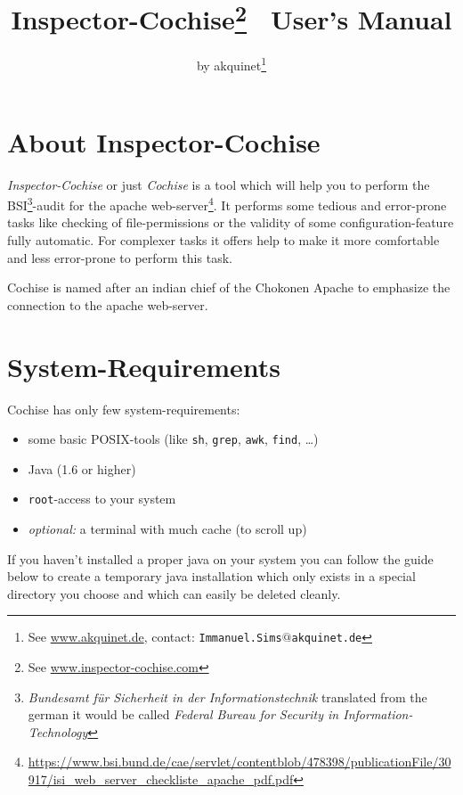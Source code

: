 \documentclass{article}
\title{Inspector-Cochise\footnote{See \url{www.inspector-cochise.com}} \ User's Manual}
\author{by akquinet\footnote{See \url{www.akquinet.de}, contact: \texttt{Immanuel.Sims$\texttt{@}$akquinet.de}}}
\begin{document}
\maketitle


\section{About Inspector-Cochise}
\emph{Inspector-Cochise} or just \emph{Cochise} is a tool which will help you to perform the BSI\footnote{\emph{Bundesamt für Sicherheit
in der Informationstechnik} translated from the german it would be called \emph{Federal Bureau for Security in Information-Technology}}-audit
for the apache web-server\footnote{
\url{https://www.bsi.bund.de/cae/servlet/contentblob/478398/publicationFile/30917/isi_web_server_checkliste_apache_pdf.pdf}}.
It performs some tedious and error-prone tasks like checking of file-permissions or the validity of some configuration-feature fully automatic.
For complexer tasks it offers help to make it more comfortable and less error-prone to perform this task.
\par
Cochise is named after an indian chief of the Chokonen Apache to emphasize the connection to the apache web-server.

\section{System-Requirements}
Cochise has only few system-requirements:
\begin{itemize}
  \item some basic POSIX-tools (like \texttt{sh}, \texttt{grep}, \texttt{awk}, \texttt{find}, \ldots)
  \item Java (1.6 or higher)
  \item \texttt{root}-access to your system
  \item \emph{optional:} a terminal with much cache (to scroll up)
\end{itemize}
If you haven't installed a proper java on your system you can follow the guide below to create a temporary java installation which only
exists in a special directory you choose and which can easily be deleted cleanly.
\end{document}
